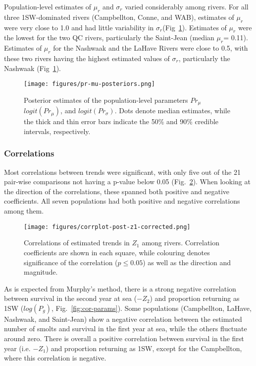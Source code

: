 \documentclass[12pt]{article}
\newcommand{\prmu}{$\mu_r$\xspace}
\newcommand{\prsig}{$\sigma_r$\xspace}
\begin{document}
Population-level estimates of \prmu and \prsig varied considerably among rivers. For all
three 1SW-dominated rivers (Campbellton, Conne, and WAB), estimates of \prmu
were very close to 1.0 and had little variability in \prsig (Fig~\ref{fig:prmu-post}).
Estimates of \prmu were the lowest for the two QC rivers, particularly the Saint-Jean (median \prmu = 0.11).
Estimates of \prmu for the Nashwaak and the LaHave Rivers were close to 0.5, with these two rivers having 
the highest estimated values of \prsig, particularly the Nashwaak (Fig~\ref{fig:prmu-post}).

\begin{figure}[htbp] \centering
    \texttt{[image: figures/pr-mu-posteriors.png]}
    \caption{Posterior estimates of the population-level parameters $Pr_{\mu}$
       $logit(Pr_{\mu})$, and $logit(Pr_{\sigma})$. Dots denote median estimates, while the thick and thin error bars indicate
       the 50\% and 90\% credible intervals, respectively.} 
   \label{fig:prmu-post} 
\end{figure}

\subsubsection*{Correlations}

Most correlations between trends were significant, with only five out of the
21 pair-wise comparisons not having a p-value below 0.05
(Fig.~\ref{fig:s1-corr}). When looking at the direction of the correlations,
these spanned both positive and negative coefficients. All seven populations had both
positive and negative correlations among them.

\begin{figure}[htbp] \centering
    \texttt{[image: figures/corrplot-post-z1-corrected.png]} \caption{
        Correlations of estimated trends in $Z_1$ among rivers. 
        Correlation coefficients are shown in each square, while colouring 
        denotes significance of the correlation ($p \leq 0.05$) as well as the direction and magnitude.}
\label{fig:s1-corr} 
\end{figure}

As is expected from Murphy's method, there is a strong negative correlation
between survival in the second year at sea ($-Z_2$) and proportion returning
as 1SW ($log(P_g)$, Fig.~\ref{fig:cor-params}). Some populations (Campbellton,
LaHave, Nashwaak, and Saint-Jean) show a negative correlation between the
estimated number of smolts and survival in the first year at sea, while the
others fluctuate around zero. There is overall a positive correlation between
survival in the first year (i.e. $-Z_1$) and proportion returning as 1SW,
except for the Campbellton, where this correlation is negative.
\end{document}
